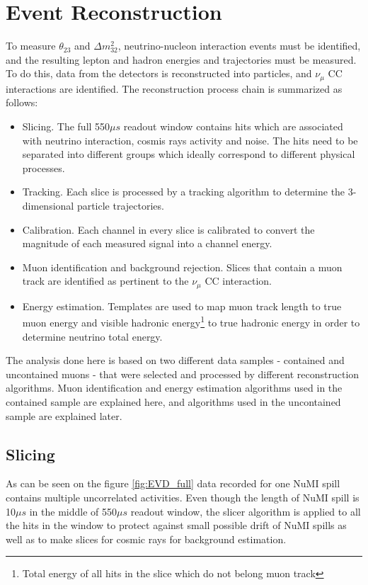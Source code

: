 \chapter{Event Reconstruction}
\label{reconstruction_chapter}

To measure $\theta_{23}$ and $\Delta m_{32}^2$, neutrino-nucleon interaction events must be identified, and the
resulting lepton and hadron energies and trajectories must be measured. To do this, data from the
detectors is reconstructed into particles, and $\nu_\mu$ CC interactions are identified. The
reconstruction process chain is summarized as follows:
\begin{itemize}
\item Slicing. The full 550$\mu s$ readout window contains hits which are associated with
neutrino interaction, cosmis rays activity and noise. The hits need to be separated into
different groups which ideally correspond to different physical processes.
\item Tracking.  Each slice is processed by a tracking algorithm to determine the 3-dimensional particle
trajectories.
\item Calibration. Each channel in every slice is calibrated to convert the magnitude of each
measured signal into a channel energy.
\item Muon identification and background rejection. Slices that contain a muon track are identified
as pertinent to the $\nu_\mu$ CC interaction.
\item Energy estimation. Templates are used to map muon track length to true muon energy and visible 
hadronic energy\footnote{Total energy of all hits in the slice which do not belong muon track} to true 
hadronic energy in order to determine neutrino total energy.  
\end{itemize}
The analysis done here is based on two different data samples - contained and uncontained muons -
that were selected and processed by different reconstruction algorithms. Muon identification and energy
estimation algorithms used in the contained sample are explained here, and algorithms used in the uncontained
sample are explained later.

\section{Slicing}
As can be seen on the figure \ref{fig:EVD_full} data recorded for one NuMI spill contains
multiple uncorrelated activities. Even though the length of NuMI spill is 10$\mu s$ in the middle
of 550$\mu s$ readout window, the slicer algorithm is applied to all the hits in the window to protect 
against small possible drift of NuMI spills as well as to make slices for cosmic rays for background
estimation.

